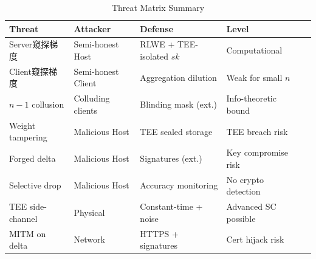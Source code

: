 \begin{table}[t]
\centering
\caption{Threat Matrix Summary}
\label{tab:threat-matrix}
\begin{tabular}{@{}lllll@{}}
\toprule
\textbf{Threat} & \textbf{Attacker} & \textbf{Defense} & \textbf{Level} \\
\midrule
Server窥探梯度 & Semi-honest Host & RLWE + TEE-isolated $sk$ & Computational \\
Client窥探梯度 & Semi-honest Client & Aggregation dilution & Weak for small $n$ \\
$n-1$ collusion & Colluding clients & Blinding mask (ext.) & Info-theoretic bound \\
Weight tampering & Malicious Host & TEE sealed storage & TEE breach risk \\
Forged delta & Malicious Host & Signatures (ext.) & Key compromise risk \\
Selective drop & Malicious Host & Accuracy monitoring & No crypto detection \\
TEE side-channel & Physical & Constant-time + noise & Advanced SC possible \\
MITM on delta & Network & HTTPS + signatures & Cert hijack risk \\
\bottomrule
\end{tabular}
\end{table}
